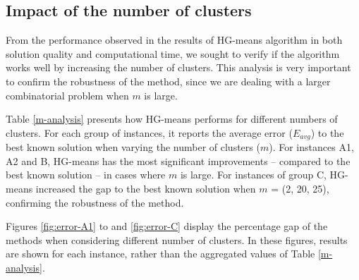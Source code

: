 







\subsection{Impact of the number of clusters}

From the performance observed in the results of HG-means algorithm in both solution quality and computational time, we sought to verify if the algorithm works well by increasing the number of clusters. %
This analysis is very important to confirm the robustness of the method, since we are dealing with a larger combinatorial problem when $m$ is large.

Table \ref{m-analysis} presents how HG-means performs for different numbers of clusters. For each group of instances, it reports the average error ($E_{avg}$) to the best known solution when varying the number of clusters ($m$). For instances A1, A2 and B, HG-means has the most significant improvements -- compared to the best known solution -- in cases where $m$ is large. For instances of group C, HG-means increased the gap to the best known solution when $m$ = (2, 20, 25), confirming the robustness of the method.



Figures \ref{fig:error-A1} to and \ref{fig:error-C} display the percentage gap of the methods when considering different number of clusters. In these figures, results are shown for each instance, rather than the aggregated values of Table \ref{m-analysis}.

